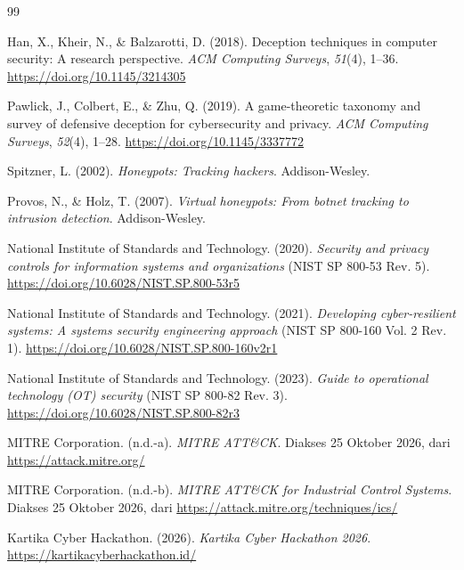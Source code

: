 \documentclass[12pt,a4paper]{article}
\begin{document}
\clearpage
{}
{}
\begin{thebibliography}{99}
\small
\setlength{\itemsep}{2pt}

Han, X., Kheir, N., \& Balzarotti, D. (2018). Deception techniques in computer security: A research perspective. \textit{ACM Computing Surveys}, \textit{51}(4), 1--36. \url{https://doi.org/10.1145/3214305}

Pawlick, J., Colbert, E., \& Zhu, Q. (2019). A game-theoretic taxonomy and survey of defensive deception for cybersecurity and privacy. \textit{ACM Computing Surveys}, \textit{52}(4), 1--28. \url{https://doi.org/10.1145/3337772}

Spitzner, L. (2002). \textit{Honeypots: Tracking hackers}. Addison-Wesley.

Provos, N., \& Holz, T. (2007). \textit{Virtual honeypots: From botnet tracking to intrusion detection}. Addison-Wesley.

National Institute of Standards and Technology. (2020). \textit{Security and privacy controls for information systems and organizations} (NIST SP 800-53 Rev. 5). \url{https://doi.org/10.6028/NIST.SP.800-53r5}

National Institute of Standards and Technology. (2021). \textit{Developing cyber-resilient systems: A systems security engineering approach} (NIST SP 800-160 Vol. 2 Rev. 1). \url{https://doi.org/10.6028/NIST.SP.800-160v2r1}

National Institute of Standards and Technology. (2023). \textit{Guide to operational technology (OT) security} (NIST SP 800-82 Rev. 3). \url{https://doi.org/10.6028/NIST.SP.800-82r3}

MITRE Corporation. (n.d.-a). \textit{MITRE ATT\&CK}. Diakses 25 Oktober 2026, dari \url{https://attack.mitre.org/}

MITRE Corporation. (n.d.-b). \textit{MITRE ATT\&CK for Industrial Control Systems}. Diakses 25 Oktober 2026, dari \url{https://attack.mitre.org/techniques/ics/}

Kartika Cyber Hackathon. (2026). \textit{Kartika Cyber Hackathon 2026}. \url{https://kartikacyberhackathon.id/}

\end{thebibliography}
\end{document}
